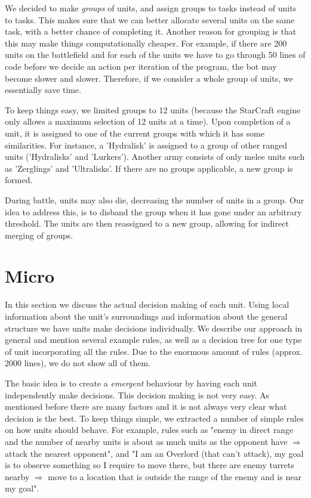 We decided to make \emph{groups} of units, and assign groups to tasks instead of units to tasks. This makes sure that we can better allocate several units on the same task, with a better chance of completing it. Another reason for grouping is that this may make things computationally cheaper. For example, if there are 200 units on the battlefield and for each of the units we have to go through 50 lines of code before we decide an action per iteration of the program, the bot may become slower and slower. Therefore, if we consider a whole group of units, we essentially save time. 

To keep things easy, we limited groups to 12 units (because the StarCraft engine only allows a maximum selection of 12 units at a time). Upon completion of a unit, it is assigned to one of the current groups with which it has some similarities. For instance, a 'Hydralisk' is assigned to a group of other ranged units ('Hydralisks' and 'Lurkers'). Another army consists of only melee units such as 'Zerglings' and 'Ultralisks'. If there are no groups applicable, a new group is formed.

During battle, units may also die, decreasing the number of units in a group. Our idea to address this, is to disband the group when it has gone under an arbitrary threshold. The units are then reassigned to a new group, allowing for indirect merging of groups.

\section{Micro}
\label{strategy:micro}
In this section we discuss the actual decision making of each unit. Using local information about the unit's surroundings and information about the general structure we have units make decisions individually. We describe our approach in general and mention several example rules, as well as a decision tree for one type of unit incorporating all the rules. Due to the enormous amount of rules (approx. 2000 lines), we do not show all of them.

The basic idea is to create a \emph{emergent} behaviour by having each unit independently make decisions. This decision making is not very easy. As mentioned before there are many factors and it is not always very clear what decision is the best. To keep things simple, we extracted a number of simple rules on how units should behave. For example, rules such as "enemy in direct range and the number of nearby units is about as much units as the opponent have $\Rightarrow$ attack the nearest opponent", and "I am an Overlord (that can't attack), my goal is to observe something so I require to move there, but there are enemy turrets nearby $\Rightarrow$ move to a location that is outside the range of the enemy and is near my goal".

